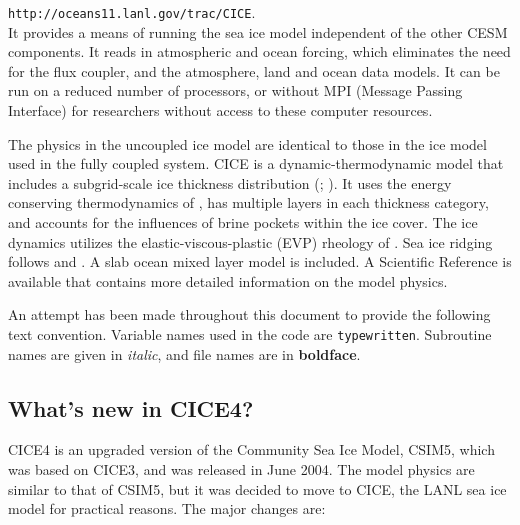                     {\tt http://oceans11.lanl.gov/trac/CICE}.\\

It provides a means of running the sea ice model independent of the other CESM 
components.  It reads in atmospheric and ocean forcing, which eliminates the 
need for the flux coupler, and the atmosphere, land and ocean data models.  It 
can be run on a reduced number of processors, or without MPI (Message Passing 
Interface) for researchers without access to these computer resources.

The physics in the uncoupled ice model are identical to those in the
ice model used in the fully coupled system.  CICE is a dynamic-thermodynamic
model that includes a subgrid-scale ice thickness distribution (\cite{bitz01};
\cite{lips01}).  It uses the energy conserving thermodynamics 
of \cite{bitz99}, has multiple layers in each thickness category, and accounts
for the influences of brine pockets within the ice cover.  The ice dynamics
utilizes the elastic-viscous-plastic (EVP) rheology of \cite{hunk97}.  Sea ice
ridging follows \cite{roth75b} and \cite{thor75}.  A slab ocean mixed layer model
is included.  A Scientific Reference is available that contains more detailed
information on the model physics. 

An attempt has been made throughout this document to provide the following
text convention.  Variable names used in the code are {\tt typewritten}.
Subroutine names are given in {\it italic}, and file names are in {\bf boldface}.

\subsection{What's new in CICE4?}

CICE4 is an upgraded version of the Community Sea Ice Model, CSIM5, which was
 based on CICE3, and was released in June 2004.  The model physics are similar to that of CSIM5, but it was decided to move to CICE, the LANL sea ice model for practical reasons.  The major changes are:

